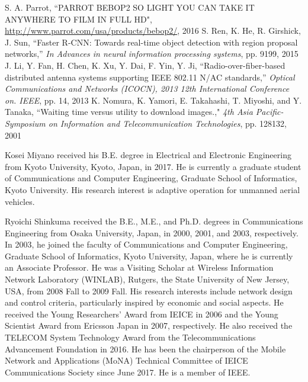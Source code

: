 \documentclass{ieeeaccess}
\begin{document}
\begin{thebibliography}{1}
 S. A. Parrot, ``PARROT BEBOP2 SO LIGHT YOU CAN TAKE IT ANYWHERE TO FILM IN FULL HD", \url{http://www.parrot.com/usa/products/bebop2/}, 2016
%
 S. Ren, K. He, R. Girshick, J. Sun, ``Faster R-CNN: Towards
real-time object detection with region proposal networks,'' \emph{In Advances in neural information processing systems}, pp. 9199, 2015
 J. Li, Y. Fan, H. Chen, K. Xu, Y. Dai, F. Yin, Y. Ji,  ``Radio-over-fiber-based distributed antenna systems supporting IEEE 802.11 N/AC standards,'' \emph{Optical Communications and Networks (ICOCN), 2013 12th International Conference on. IEEE}, pp. 14, 2013
K. Nomura, K. Yamori, E. Takahashi, T. Miyoshi, and Y. Tanaka, ``Waiting time versus utility to download images.," \emph{4th Asia Pacific-Symposium on Information and Telecommunication Technologies}, pp. 128132, 2001

\end{thebibliography}



\begin{IEEEbiography}{Kosei Miyano} received his B.E. degree in Electrical
and Electronic Engineering from Kyoto University,
Kyoto, Japan, in 2017. He is currently a graduate student of Communications and
Computer Engineering, Graduate School of Informatics,
Kyoto University. His research interest
is adaptive operation for unmanned aerial vehicles.
\end{IEEEbiography}



\begin{IEEEbiography}{Ryoichi Shinkuma} received the B.E., M.E., and
Ph.D. degrees in Communications Engineering
from Osaka University, Japan, in 2000, 2001, and
2003, respectively. In 2003, he joined the faculty
of Communications and Computer Engineering,
Graduate School of Informatics, Kyoto University,
Japan, where he is currently an Associate Professor. He was a Visiting Scholar at Wireless Information Network Laboratory (WINLAB), Rutgers,
the State University of New Jersey, USA, from
2008 Fall to 2009 Fall. His research interests include network design and
control criteria, particularly inspired by economic and social aspects. He
received the Young Researchers' Award from IEICE in 2006 and the Young
Scientist Award from Ericsson Japan in 2007, respectively. He also received
the TELECOM System Technology Award from the Telecommunications
Advancement Foundation in 2016. He has been the chairperson of the
Mobile Network and Applications (MoNA) Technical Committee of IEICE
Communications Society since June 2017. He is a member of IEEE.
\end{IEEEbiography}
\end{document}
